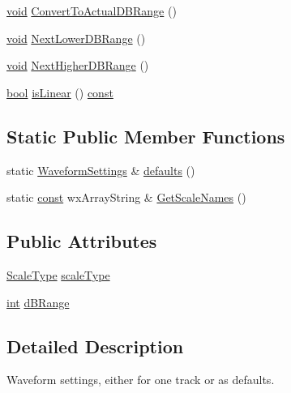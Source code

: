 \begin{DoxyCompactItemize}
\hyperlink{sound_8c_ae35f5844602719cf66324f4de2a658b3}{void} \hyperlink{class_waveform_settings_a1f3da0d79657f2c822d7abc9383b9769}{Convert\+To\+Actual\+D\+B\+Range} ()
\item 
\hyperlink{sound_8c_ae35f5844602719cf66324f4de2a658b3}{void} \hyperlink{class_waveform_settings_a860fa6f33eb833eae1cf68f7178b8ea3}{Next\+Lower\+D\+B\+Range} ()
\item 
\hyperlink{sound_8c_ae35f5844602719cf66324f4de2a658b3}{void} \hyperlink{class_waveform_settings_af746e690c5329e12998cf12c8ffe287e}{Next\+Higher\+D\+B\+Range} ()
\item 
\hyperlink{mac_2config_2i386_2lib-src_2libsoxr_2soxr-config_8h_abb452686968e48b67397da5f97445f5b}{bool} \hyperlink{class_waveform_settings_ae4f07aa847f89f72a127ba5e357f1e78}{is\+Linear} () \hyperlink{getopt1_8c_a2c212835823e3c54a8ab6d95c652660e}{const} 
\end{DoxyCompactItemize}
\subsection*{Static Public Member Functions}
\begin{DoxyCompactItemize}
\item 
static \hyperlink{class_waveform_settings}{Waveform\+Settings} \& \hyperlink{class_waveform_settings_a7405a35e953949379b89a4fdedb3f91a}{defaults} ()
\item 
static \hyperlink{getopt1_8c_a2c212835823e3c54a8ab6d95c652660e}{const} wx\+Array\+String \& \hyperlink{class_waveform_settings_aa8a239cf44808f3ebd93cb7f1e7ba572}{Get\+Scale\+Names} ()
\end{DoxyCompactItemize}
\subsection*{Public Attributes}
\begin{DoxyCompactItemize}
\item 
\hyperlink{class_waveform_settings_a62e3323b180e270201c4bd5bcf52b4e4}{Scale\+Type} \hyperlink{class_waveform_settings_a6866a0a302099ef5fcd4fb60cba946cd}{scale\+Type}
\item 
\hyperlink{xmltok_8h_a5a0d4a5641ce434f1d23533f2b2e6653}{int} \hyperlink{class_waveform_settings_a97217e305f6eb7ead4452924fec4029d}{d\+B\+Range}
\end{DoxyCompactItemize}


\subsection{Detailed Description}
Waveform settings, either for one track or as defaults. 

